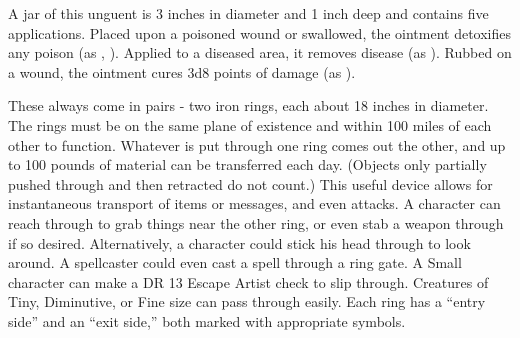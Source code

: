 {

 A jar of this unguent is 3 inches in diameter and 1 inch deep and contains five applications. Placed upon a poisoned wound or swallowed, the ointment detoxifies any poison (as , ). Applied to a diseased area, it removes disease (as ). Rubbed on a wound, the ointment cures 3d8 points of damage (as ).


 These always come in pairs - two iron rings, each about 18 inches in diameter. The rings must be on the same plane of existence and within 100 miles of each other to function. Whatever is put through one ring comes out the other, and up to 100 pounds of material can be transferred each day. (Objects only partially pushed through and then retracted do not count.) This useful device allows for instantaneous transport of items or messages, and even attacks. A character can reach through to grab things near the other ring, or even stab a weapon through if so desired. Alternatively, a character could stick his head through to look around. A spellcaster could even cast a spell through a ring gate. A Small character can make a DR 13 Escape Artist check to slip through. Creatures of Tiny, Diminutive, or Fine size can pass through easily. Each ring has a ``entry side'' and an ``exit side,'' both marked with appropriate symbols.


\begin{comment}
Robe of the Archmagi} This normal-appearing garment can be white (01?45 on d\%, good alignment), gray (46?75, neither good nor evil alignment), or black (76?100, evil alignment). Its wearer, if an arcane spellcaster, gains the following powers.
\begin{itemize}
\item \plus5 armor bonus to AC.
\item Spell resistance 18.
\item \plus4 resistance bonus on all saving throws.
\item \plus2 enhancement bonus on caster level checks made to overcome spell resistance.
\end{itemize}


\end{comment}}
